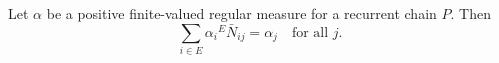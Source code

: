 Let $\alpha$ be a positive finite-valued regular measure for a recurrent chain $P$. Then
$$\sum_{i \in E} \alpha_i {}^E \bar{N}_{ij} = \alpha_j \quad \text{for all } j.$$
